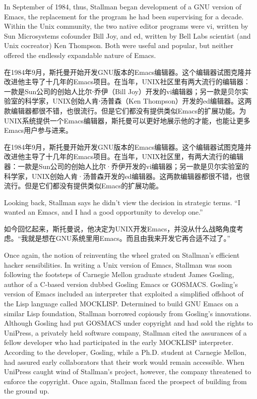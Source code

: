 \ifdefined\vtwo
In September of 1984, thus, Stallman began development of a GNU version of Emacs, the replacement for the program he had been supervising for a decade. Within the Unix community, the two native editor programs were vi, written by Sun Microsystems cofounder Bill Joy, and ed, written by Bell Labs scientist (and Unix cocreator) Ken Thompson. Both were useful and popular, but neither offered the endlessly expandable nature of Emacs.
\fi
\fi

\ifdefined\chs
\ifdefined\vone
在1984年9月，斯托曼开始开发GNU版本的Emacs编辑器。这个编辑器试图克隆并改进他主导了十几年的Emacs项目。在当年，UNIX社区里有两大流行的编辑器：一款是Sun公司的创始人比尔⋅乔伊（Bill Joy）开发的vi编辑器；另一款是贝尔实验室的科学家，UNIX创始人肯⋅汤普森（Ken Thompson）开发的ed编辑器。这两款编辑器都很不错，也很流行。但是它们都没有提供类似Emacs的扩展功能。为UNIX系统提供一个Emacs编辑器，斯托曼可以更好地展示他的才能，也能让更多Emacs用户参与进来。
\fi

\ifdefined\vtwo
在1984年9月，斯托曼开始开发GNU版本的Emacs编辑器。这个编辑器试图克隆并改进他主导了十几年的Emacs项目。在当年，UNIX社区里，有两大流行的编辑器：一款是Sun公司的创始人比尔·乔伊开发的vi编辑器；另一款是贝尔实验室的科学家，UNIX创始人肯·汤普森开发的ed编辑器。这两款编辑器都很不错，也很流行。但是它们都没有提供类似Emacs的扩展功能。
\fi
\fi

\ifdefined\eng
Looking back, Stallman says he didn't view the decision in strategic terms. ``I wanted an Emacs, and I had a good opportunity to develop one.''
\fi

\ifdefined\chs
如今回忆起来，斯托曼说，他决定为UNIX开发Emacs，并没从什么战略角度考虑。``我就是想在GNU系统里用Emacs。而且由我来开发它再合适不过了。''\fi

\ifdefined\vone
\ifdefined\eng
Once again, the notion of reinventing the wheel grated on Stallman's efficient hacker sensibilities. In writing a Unix version of Emacs, Stallman was soon following the footsteps of Carnegie Mellon graduate student James Gosling, author of a C-based version dubbed Gosling Emacs or GOSMACS. Gosling's version of Emacs included an interpreter that exploited a simplified offshoot of the Lisp language called MOCKLISP. Determined to build GNU Emacs on a similar Lisp foundation, Stallman borrowed copiously from Gosling's innovations. Although Gosling had put GOSMACS under copyright and had sold the rights to UniPress, a privately held software company, Stallman cited the assurances of a fellow developer who had participated in the early MOCKLISP interpreter. According to the developer, Gosling, while a Ph.D. student at Carnegie Mellon, had assured early collaborators that their work would remain accessible. When UniPress caught wind of Stallman's project, however, the company threatened to enforce the copyright. Once again, Stallman faced the prospect of building from the ground up.
\fi

